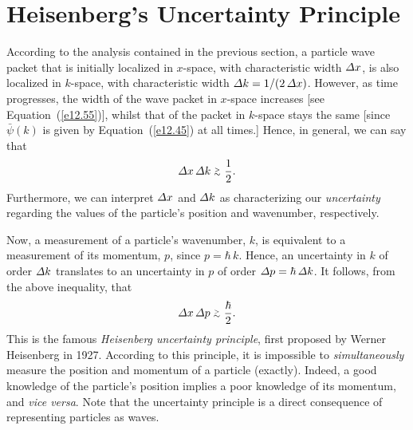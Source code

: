\section{Heisenberg's Uncertainty Principle}\label{sun}
According to the analysis contained in the previous section, a particle
wave packet that is initially localized in $x$-space, with characteristic
width ${\mit\Delta}x$, is also localized in $k$-space, with characteristic
width ${\mit\Delta}k= 1/(2\,{\mit\Delta} x)$. However, as time progresses,
the width of the wave packet in $x$-space increases [see Equation~(\ref{e12.55})], whilst that of the packet in $k$-space stays the same [since $\bar{\psi}(k)$ is given by Equation~(\ref{e12.45}) at all times.] Hence,
in general, we can say that
\begin{equation}
{\mit\Delta}x\,{\mit\Delta} k\gtapp \frac{1}{2}.
\end{equation}
Furthermore, we can interpret ${\mit\Delta}x$ and ${\mit\Delta} k$ as
characterizing our {\em uncertainty}\/ regarding the values of the particle's
position and wavenumber, respectively.

Now, a measurement of a particle's wavenumber, $k$, is equivalent to
a measurement of its momentum, $p$, since $p=\hbar \,k$. Hence,
an uncertainty in $k$ of order ${\mit\Delta} k$ translates to
an uncertainty in $p$ of order ${\mit\Delta}p=\hbar\,{\mit\Delta}k$.
It follows, from the above inequality, that
\begin{equation}\label{e12.58}
{\mit\Delta}x\,{\mit\Delta} p \gtapp \frac{\hbar}{2}. 
\end{equation}
This is the famous {\em Heisenberg uncertainty principle},
first proposed by Werner Heisenberg in 1927.
According to this principle, it is impossible to {\em simultaneously}\/
measure the position and momentum of a particle (exactly). Indeed, a good knowledge
of the particle's position implies a poor knowledge of its momentum,
and {\em vice versa}. Note that the uncertainty principle is a direct consequence of representing particles as waves.

